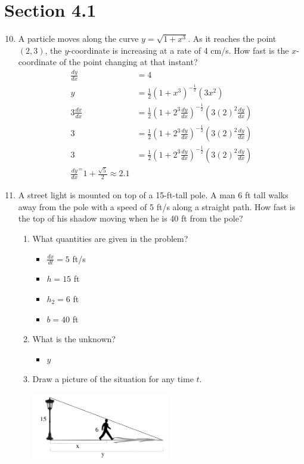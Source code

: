 \documentclass{article}
\begin{document}
\section{Section 4.1}
\begin{enumerate}
\setcounter{enumi}{9}
	\item A particle moves along the curve $y=\sqrt{1+x^3}$. As it reaches the point $(2,3)$, the $y$-coordinate is increasing at a rate of 4 cm/s. How fast is the $x$-coordinate of the point changing at that instant?\newline
	$$\begin{align}
		\frac{dy}{dx} &= 4\\
		y &= \frac{1}{2}(1+x^3)^{-\frac{1}{2}} (3x^2)\\
		3\frac{dx}{dx} &= \frac{1}{2}(1+2^3\frac{dy}{dx})^{-\frac{1}{2}} (3(2)^2\frac{dy}{dx})\\
		3 &= \frac{1}{2}(1+2^3\frac{dy}{dx})^{-\frac{1}{2}} (3(2)^2\frac{dy}{dx})\\
		3 &= \frac{1}{2}(1+2^3\frac{dy}{dx})^{-\frac{1}{2}} (3(2)^2\frac{dy}{dx})\\
		\frac{dy}{dx} ^= 1+\frac{\sqrt{5}}{2} \approx \boxed{2.1}
	\end{align}$$
\setcounter{enumi}{13}
	\item A street light is mounted on top of a 15-ft-tall pole. A man 6 ft tall walks away from the pole with a speed of 5 ft/s along a straight path. How fast is the top of his shadow moving when he is 40 ft from the pole?
		\begin{enumerate}
			\item What quantities are given in the problem?
				\begin{itemize}
					\item $\frac{dx}{dt}=5$ ft/s
					\item $h=15$ ft
					\item $h_2=6$ ft
					\item $b=40$ ft
				\end{itemize}
			\item What is the unknown?
				\begin{itemize}
					\item $y$
				\end{itemize}
			\item Draw a picture of the situation for any time $t$.
					\begin{center}
			\includegraphics[width=6cm]{images/41pr14}

\end{center}
\end{enumerate}
\end{enumerate}
\end{document}
